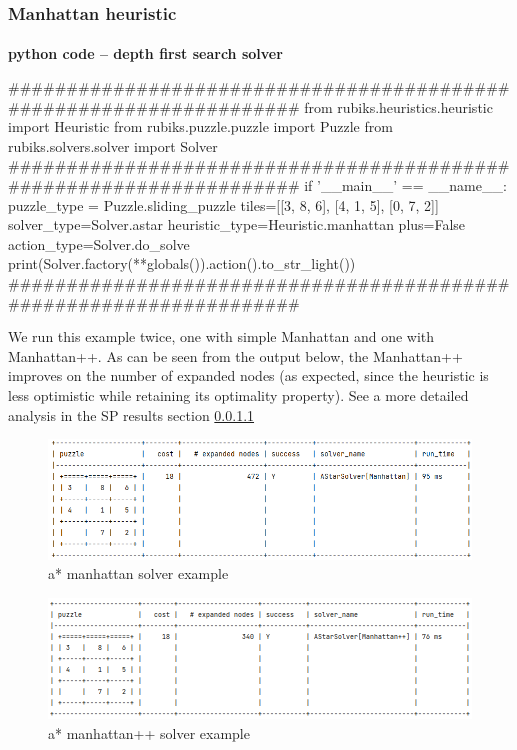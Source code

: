 \subsubsection{Manhattan heuristic}



\afblue
\paragraph{}{\textbf{python code -- depth first search solver}}
\begin{python}
####################################################################
from rubiks.heuristics.heuristic import Heuristic
from rubiks.puzzle.puzzle import Puzzle
from rubiks.solvers.solver import Solver
####################################################################
if '__main__' == __name__:
    puzzle_type = Puzzle.sliding_puzzle
    tiles=[[3, 8, 6], [4, 1, 5], [0, 7, 2]]
    solver_type=Solver.astar
    heuristic_type=Heuristic.manhattan
    plus=False
    action_type=Solver.do_solve
    print(Solver.factory(**globals()).action().to_str_light())
####################################################################
\end{python}
\black
We run this example twice, one with simple Manhattan and one with Manhattan++. As can be seen from the output below, the Manhattan++ improves on the number of expanded nodes (as expected, since the heuristic is less optimistic while retaining its optimality property). See a more detailed analysis in the SP results section \ref{}

\begin{figure}[H]
\centering
\includegraphics[scale=0.5]{./Figures/exampleastarmanhattansolver}
\caption[Examples]{a* manhattan solver example}
\label{fig:exampleastarmanhattansolver}
\end{figure}

\begin{figure}[H]
\centering
\includegraphics[scale=0.5]{./Figures/exampleastarmanhattanplussolver}
\caption[Examples]{a* manhattan++ solver example}
\label{fig:exampleastarmanhattanplussolver}
\end{figure}



